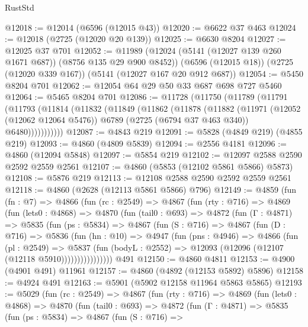\begin{lexlean}{RustStd}
\begin{coremodule}
@12018 := @12014 (@6596 (@12015 @43))
@12020 := @6622 @37 @463
@12024 := @12018 (@2725 (@12020 @20 @139))
@12025 := @6630 @8204
@12027 := @12025 @37 @701
@12052 := @11989
    (@12024 (@5141 (@12027 @139 @260 @1671 @687)) (@8756 @135 @29 @900 @8452))
    (@6596 (@12015 @18))
    (@2725 (@12020 @339 @167))
    (@5141 (@12027 @167 @20 @912 @687))
@12054 := @5450 @8204 @701
@12062 := @12054 @64 @29 @50 @33 @687 @698 @727 @5460
@12064 := @5465 @8204 @701
@12086 := @11728
    (@11750
      (@11789
        (@11791
          (@11793
            (@11814
              (@11832
                (@11849
                  (@11862
                    (@11878
                      (@11882
                        (@11971
                          (@12052 (@12062 @12064 @5476))
                          @6789
                          (@2725 (@6794 @37 @463 @340))
                          @6480)))))))))))
@12087 := @4843 @219
@12091 := @5828 (@4849 @219) (@4855 @219)
@12093 := @4860 (@4809 @5839)
@12094 := @2556 @4181
@12096 := @4860 (@12094 @5848)
@12097 := @5854 @219
@12102 := @12097 @2588 @2590 @2592 @2559 @2561
@12107 := @4860 (@5853 (@12102 @5861 @5866) @5873)
@12108 := @5876 @219
@12113 := @12108 @2588 @2590 @2592 @2559 @2561
@12118 := @4860 (@2628 (@12113 @5861 @5866) @796)
@12149 := @4859
    (fun (fn : @7) =>
    @4866
      (fun (rc : @2549) =>
      @4867
        (fun (rty : @716) =>
        @4869
          (fun (lets0 : @4868) =>
          @4870
            (fun (tail0 : @693) =>
            @4872
              (fun (Γ : @4871) =>
              @5835
                (fun (ps : @5834) =>
                @4867
                  (fun (S : @716) =>
                  @4867
                    (fun (D : @716) =>
                    @5836
                      (fun (hn : @10) =>
                      @4947
                        (fun (pns : @4946) =>
                        @4866
                          (fun (pl : @2549) =>
                          @5837
                            (fun (bodyL : @2552) =>
                            @12093 (@12096 (@12107 (@12118 @5910))))))))))))))))
    @491
@12150 := @4860 @4811
@12153 := @4900 (@4901 @491) @11961
@12157 := @4860 (@4892 (@12153 @5892) @5896)
@12158 := @4924 @491
@12163 := @5901 (@5902 @12158 @11964 @5863 @5865)
@12193 := @5029
    (fun (rc : @2549) =>
    @4867
      (fun (rty : @716) =>
      @4869
        (fun (lets0 : @4868) =>
        @4870
          (fun (tail0 : @693) =>
          @4872
            (fun (Γ : @4871) =>
            @5835
              (fun (ps : @5834) =>
              @4867
                (fun (S : @716) =>

\end{coremodule}
\end{lexlean}
